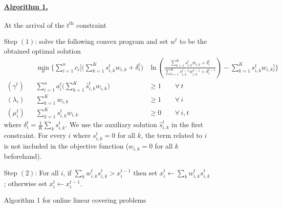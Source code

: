 

%
\begin{figure}[ht]
\begin{mdframed}
\paragraph{\underline{Algorithm 1.}} At the arrival of the $t^{\text{th}}$ constraint

\vspace{0.1cm}
Step $(1)$: solve the following convex program and set $w^t$ to be the obtained optimal solution
%
\begin{align*}
	&& \min_{w} \biggl\{\sum_{i=1}^{n} c_{i}  \biggl[  \biggl(\sum_{k=1}^{K} s_{i,k}^{t} w_{i,k}  + \delta_{i}^{t} \biggr) &
	\ln \left( \frac{\sum_{k=1}^{K} s_{i,k}^{t} w_{i,k}  + \delta_{i}^{t}}{ \sum_{k=1}^{K}  s_{i,k}^{t-1}w_{i,k}^{t-1}  + \delta_{i}^{t-1}}  \right)
	- \sum_{k=1}^{K}  s_{i,k}^{t} w_{i,k} \biggr] \biggr\} \\
		(\gamma^{t})  && \sum_{i=1}^{n} a_{i}^{t} \biggl( \sum_{k=1}^{K}  \hat{s}_{i,k}^{t} w_{i,k} \biggr) &\geq 1 \qquad \forall\ t\\
		(\lambda_{i}) && \sum_{k=1}^{K}  w_{i,k} &\geq 1 \qquad \forall\ i\\
		(\mu_{i}^{t}) && \sum_{k=1}^{K} s_{i,k}^{t} w_{i,k} &\geq 0 \qquad \forall\ i,t
	\end{align*}
	where $\delta_{i}^{t} = \frac{1}{K} \sum_{k} s_{i,k}^{t}$.
	We use the auxiliary solution $\hat{s}_{i,k}^{t}$ in the first constraint. For every $i$ where $s_{i,k}^{t} = 0$ for all $k$, the term related to $i$ is not included in the objective function ($w_{i,k} = 0$ for all $k$ beforehand).

	\vspace{0.1cm}
	Step $(2)$: For all $i$, if $\sum_{k} w_{i,k}^{t} s_{i,k}^{t} > x_{i}^{t-1}$ then set $x_{i}^{t} \gets \sum_{k} w_{i,k}^{t} s_{i,k}^{t}$;
	otherwise set $x_{i}^{t} \gets x_{i}^{t-1}$.
\end{mdframed}
	\caption{Algorithm 1 for online linear covering problems}
	\label{fig:algo1}
\end{figure}

